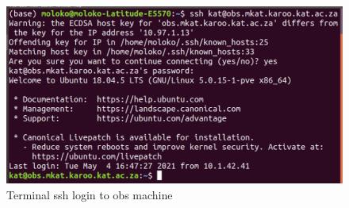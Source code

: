 %	
\begin{figure}[!thb]
	\centering
	\includegraphics[scale=0.33]{Chapters/images/terminal.png}
	
	\caption{Terminal ssh login to obs machine}
	\label{fig:image87}
\end{figure}
